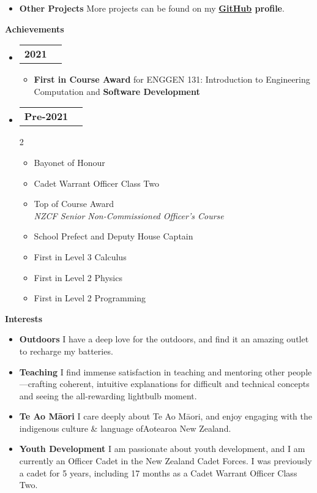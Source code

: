 \documentclass[11pt,a4paper]{article}[leftmargin=*]
\makeatletter
\def \entryspacing {-0pt}
\def \bulletstylei {\faAngleRight\hspace{-4.5pt}}
\renewcommand{\section}[2]{\vspace{5pt}
  \colorbox{secondary}{\color{white}\raggedbottom\normalsize\textbf{{#1}{\hspace{2pt}#2\hspace{4pt}}}}
}
\newcommand{\resumeEntryStart}{\begin{itemize}[leftmargin=2.5mm]}
\newcommand{\resumeEntryEnd}{\end{itemize}\vspace{\entryspacing}}
\newcommand{\resumeItemListStart}{\begin{itemize}[leftmargin=4.5mm]}
\newcommand{\resumeItemListEnd}{\end{itemize}}
\newcommand{\resumeItemListStartColumns}[2][-0.5]{\vspace*{#1\multicolsep}
\begin{multicols}{#2}\begin{itemize}[leftmargin=4.5mm]}
\newcommand{\resumeItemListEndColumns}[1][-1]{\end{itemize}\end{multicols}\vspace*{#1\multicolsep}}
\newcommand{\resumeItem}[2][\bulletstylei]{
  \item[\small#1]\small{
    {#2 \vspace{-2pt}}
  }
}
\newcommand{\resumeEntryTD}[2]{
  \vspace{-1pt}\item[]
    \begin{tabularx}{0.97\textwidth}{X@{\hspace{60pt}}r}
      \textbf{\color{primary}#1} & {\firabook\color{accent}\small#2} \\
    \end{tabularx}\vspace{-6pt}
}
\newcommand{\resumeEntryS}[2]{
  \item[]\small{
    \textbf{\color{primary}#1 }{ #2 \vspace{-2pt}}
  }
}
\newcommand{\resumeIt}[1]{\textit{\color{accent}#1}}
\newcommand{\resumeBf}[1]{\small\textbf{\color{halfbold}#1}}
\makeatother
\begin{document}
\resumeEntryStart
\resumeEntryS
{Other Projects}{More projects can be found on my \resumeBf{\href{https://github.com/jamesnzl}{GitHub} profile}.}
\resumeEntryEnd


\section{\faTrophy}{Achievements}

\resumeEntryStart
\resumeEntryTD{2021}{}
\resumeItemListStart
\resumeItem {\resumeBf{First in Course Award} for ENGGEN 131: Introduction to Engineering Computation and \resumeBf{Software Development}}
\resumeItemListEnd
\resumeEntryEnd

\resumeEntryStart
\resumeEntryTD{Pre-2021}{}
\resumeItemListStartColumns[-0.3]{2}
\resumeItem {Bayonet of Honour}
\resumeItem {Cadet Warrant Officer Class Two}
\resumeItem {Top of Course Award\\\resumeIt{NZCF Senior Non-Commissioned Officer's Course}}
\resumeItem {School Prefect and Deputy House Captain}
\resumeItem {First in Level 3 Calculus}
\resumeItem {First in Level 2 Physics}
\resumeItem {First in Level 2 Programming}
\resumeItemListEndColumns
\resumeEntryEnd


\section{\faUserCircle}{Interests}

\resumeEntryStart
\resumeEntryS
{Outdoors}
{
  I have a deep love for the outdoors, and find it an amazing outlet to recharge my batteries.
}

\resumeEntryS
{Teaching}
{
  I find immense satisfaction in teaching and mentoring other people---crafting coherent, intuitive explanations for difficult and technical concepts and seeing the all-rewarding lightbulb moment.
}

\resumeEntryS
{Te Ao Māori}
{
  I care deeply about Te Ao Māori, and enjoy engaging with the indigenous culture \& language of\linebreak Aotearoa New Zealand.
}

\resumeEntryS
{Youth Development}
{
  I am passionate about youth development, and I am currently an Officer Cadet in the New Zealand Cadet Forces. I was previously a cadet for 5 years, including 17 months as a Cadet Warrant Officer Class Two.
}

\resumeEntryEnd
\end{document}
